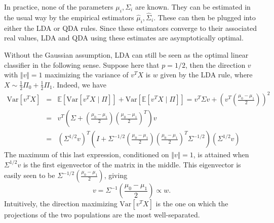 \documentclass[10pt, a4paper]{report}
\newcommand{\E}[0]{\mathbb{E}}
\theoremstyle{definition}
\theoremstyle{remark}
\begin{document}
In practice, none of the parameters $\mu_i,\Sigma_i$ are known. They can be estimated in the usual way by the empirical estimators $\hat{\mu}_i,\hat{\Sigma}_i$. These can then be plugged into either the LDA or QDA rules. Since these estimators converge to their associated real values, LDA and QDA using these estimates are asymptotically optimal.

Without the Gaussian assumption, LDA can still be seen as the optimal linear classifier in the following sense. Suppose here that $p=1/2$, then the direction $v$ with $\Vert v\Vert=1$ maximizing the variance of $v^TX$ is $w$ given by the LDA rule, where $X\sim \frac{1}{2}\Pi_0 + \frac{1}{2}\Pi_1$. Indeed, we have 
\begin{eqnarray*}
	\mathrm{Var}[v^T X] & = & \E[\mathrm{Var}[v^TX\mid \Pi]] + \mathrm{Var}[\E[v^TX \mid \Pi]] = v^T\Sigma v + \left(v^T\left(\frac{\mu_0-\mu_1}{2}\right)\right)^2 \\
	& = & v^T \left(\Sigma + \left(\frac{\mu_0-\mu_1}{2}\right)\left(\frac{\mu_0-\mu_1}{2}\right)^T \right)v\\
	& = & (\Sigma^{1/2} v)^T \left(I + \Sigma^{-1/2}\left(\frac{\mu_0-\mu_1}{2}\right)\left(\frac{\mu_0-\mu_1}{2}\right)^T\Sigma^{-1/2} \right)(\Sigma^{1/2} v)
\end{eqnarray*}
The maximum of this last expression, conditioned on $\Vert v\Vert=1$, is attained when $\Sigma^{1/2}v$ is the first eigenvector of the matrix in the middle. This eigenvector is easily seen to be $\Sigma^{-1/2}(\frac{\mu_0-\mu_1}{2})$, giving
$$v = \Sigma^{-1}\left(\frac{\mu_0-\mu_1}{2}\right) \propto w.$$
Intuitively, the direction maximizing $\mathrm{Var}[v^T X]$ is the one on which the projections of the two populations are the most well-separated.
\end{document}
